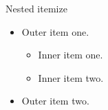 \documentclass[14pt,t]{beamer-accessibility}
\begin{document}
\begin{frame}{Nested itemize}
\begin{itemize}
\item Outer item one.
  \begin{itemize}
  \item Inner item one.
  \item Inner item two.
  \end{itemize}
\item Outer item two.
\end{itemize}
\end{frame}
\end{document}
